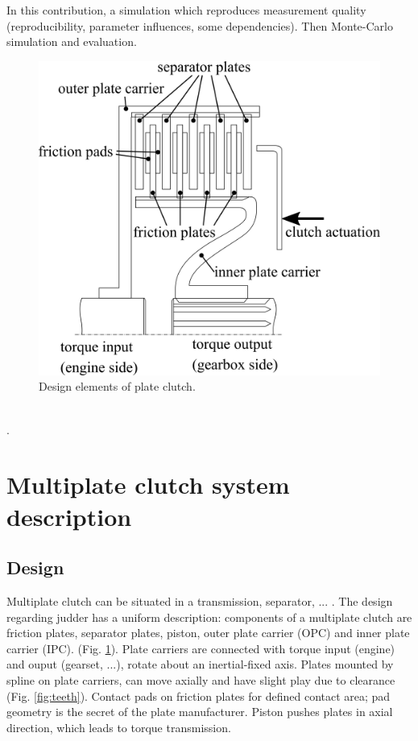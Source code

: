 \documentclass[a4paper,fleqn]{cas-dc}
\begin{document}
In this contribution, a simulation which reproduces measurement quality (reproducibility, parameter influences, some dependencies). Then Monte-Carlo simulation and evaluation. 
\begin{figure}
	\centering
	\includegraphics[scale=.75]{figs/Design.png}
	\caption{Design elements of plate clutch. }
	\label{fig:design}
\end{figure}\\
\cite{centea2001non,gregori2014Judder,jacobsson2003Aspects,jahagirdar2007Judder}. 

\section{Multiplate clutch system description}
\subsection{Design}
Multiplate clutch can be situated in a transmission, separator, ... . The design regarding judder has a uniform description: components of a multiplate clutch are friction plates, separator plates, piston, outer plate carrier (OPC) and inner plate carrier (IPC). (Fig. \ref{fig:design}). Plate carriers are connected with torque input (engine) and ouput (gearset, ...), rotate about an inertial-fixed axis. Plates mounted by spline on plate carriers, can move axially and have slight play due to clearance (Fig. \ref{fig:teeth}). Contact pads on friction plates for defined contact area; pad geometry is the secret of the plate manufacturer. Piston pushes plates in axial direction, which leads to torque transmission. \\
\end{document}
